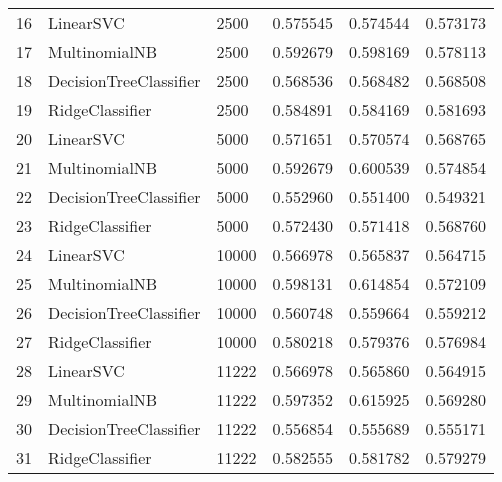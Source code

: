 \begin{tabular}{lllrrr}
16 &               LinearSVC &         2500 &  0.575545 &   0.574544 &  0.573173 \\
17 &           MultinomialNB &         2500 &  0.592679 &   0.598169 &  0.578113 \\
18 &  DecisionTreeClassifier &         2500 &  0.568536 &   0.568482 &  0.568508 \\
19 &         RidgeClassifier &         2500 &  0.584891 &   0.584169 &  0.581693 \\
20 &               LinearSVC &         5000 &  0.571651 &   0.570574 &  0.568765 \\
21 &           MultinomialNB &         5000 &  0.592679 &   0.600539 &  0.574854 \\
22 &  DecisionTreeClassifier &         5000 &  0.552960 &   0.551400 &  0.549321 \\
23 &         RidgeClassifier &         5000 &  0.572430 &   0.571418 &  0.568760 \\
24 &               LinearSVC &        10000 &  0.566978 &   0.565837 &  0.564715 \\
25 &           MultinomialNB &        10000 &  0.598131 &   0.614854 &  0.572109 \\
26 &  DecisionTreeClassifier &        10000 &  0.560748 &   0.559664 &  0.559212 \\
27 &         RidgeClassifier &        10000 &  0.580218 &   0.579376 &  0.576984 \\
28 &               LinearSVC &        11222 &  0.566978 &   0.565860 &  0.564915 \\
29 &           MultinomialNB &        11222 &  0.597352 &   0.615925 &  0.569280 \\
30 &  DecisionTreeClassifier &        11222 &  0.556854 &   0.555689 &  0.555171 \\
31 &         RidgeClassifier &        11222 &  0.582555 &   0.581782 &  0.579279 \\
\bottomrule
\end{tabular}
